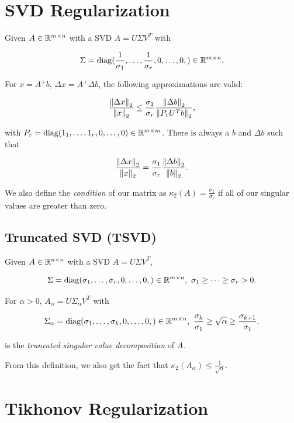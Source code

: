 \section{SVD Regularization}

Given \(A \in \mathbb{R}^{m \times n}\) with a SVD \(A = U \Sigma V^T\) with 

\[
    \Sigma = \mathrm{diag}(\frac{1}{\sigma_1}, \dots, \frac{1}{\sigma_r}, 0, \dots, 0,) \in \mathbb{R}^{m \times n}.
\]

For \(x = A^+b, \, \Delta x = A^+ \Delta b\), the following approximations are valid: 

\[
    \frac{\left\| \Delta x \right\|_2}{\left\| x \right\|_2} \le \frac{\sigma_1}{\sigma_r} \frac{\left\| \Delta b \right\|_2}{\left\| P_r U^T b \right\|_2},
\]

with \(P_r = \mathrm{diag}(1_1, \dots, 1_r, 0, \dots, 0) \in \mathbb{R}^{m \times m}\). There is always a \(b\) and \(\Delta b\) such that

\[
    \frac{\left\| \Delta x \right\|_2}{\left\| x \right\|_2} = \frac{\sigma_1}{\sigma_r} \frac{\left\| \Delta b \right\|_2}{\left\| b \right\|_2}.
\]

We also define the \emph{condition} of our matrix as \(\kappa_2(A) = \frac{\sigma_1}{\sigma_r}\) if all of our singular values are greater than zero.

\subsection{Truncated SVD (TSVD)}

Given \(A \in \mathbb{R}^{n \times n}\) with a SVD \(A = U \Sigma V^T\), 

\[
    \Sigma = \mathrm{diag}(\sigma_1, \dots, \sigma_r, 0, \dots, 0,) \in \mathbb{R}^{m \times n}, \ \sigma_1 \ge \dots \ge \sigma_r > 0.
\]

For \(\alpha > 0\), \(A_{\alpha} = U \Sigma_{\alpha} V^T\) with

\[
    \Sigma_{\alpha}= \mathrm{diag}(\sigma_1, \dots, \sigma_k, 0, \dots, 0,) \in \R^{m \times n}, \ \frac{\sigma_k}{\sigma_1} \ge \sqrt{\alpha} \ge \frac{\sigma_{k + 1}}{\sigma_1}.
\]

is the \emph{truncated singular value decomposition} of \(A\).

From this definition, we also get the fact that \(\kappa_2 (A_{\alpha}) \le \frac{1}{\sqrt{\alpha}}\).

\section{Tikhonov Regularization}

